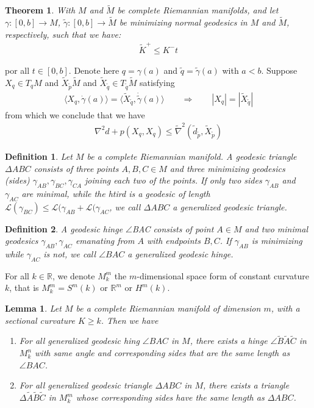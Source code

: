 \documentclass[11pt]{book}
\theoremstyle{break}
\theoremstyle{break}
\newtheorem{thm}{Theorem}[section]
\newtheorem{lem}{Lemma}[thm]
\newtheorem{defn}{Definition}[corL]
\newcommand{\R}{\mathbb{R}}
\newcommand{\that}[1]{\widetilde{#1}}
\begin{document}
\begin{thm}
With $M$ and $\that{M}$ be complete Riemannian manifolds, and let $\gamma:[0,b] \to M$, $\that{\gamma}: [0,b] \to \that{M}$ be minimizing normal geodesics in $M$ and $\that{M}$, respectively, such that we have:
\begin{align*}
\that{K}^+ \leq K^{-}t 
\end{align*}
\end{thm}
por all $t \in [0,b]$. Denote here $q = \gamma(a)$ and $\that{q} = \that{\gamma}(a)$ with $a<b$. Suppose $X_q \in T_qM$ and $\that{X}_{\that{p}}\that{M}$ and $\that{X}_{\that{q}} \in T_{\that{q} }\that{M}$ satisfying
\begin{align*}
\langle X_q , \dot{\gamma}(a) \rangle = \langle \that{X}_{\that{q}} , \dot{\that{\gamma}} (a) \rangle \qquad \Rightarrow \qquad |X_q| = |\that{X}_{\that{q}}|
\end{align*}
from which we conclude that we have
\begin{align*}
\nabla^2 d+p(X_q,X_q) \leq \that{\nabla}^2 (\that{d}_{\that{p}}, \that{X}_{\that{p}})
\end{align*}


\begin{defn}
Let $M$ be a complete Riemannian manifold. A geodesic triangle $\Delta ABC$ consists of three points $A,B,C \in M$ and three minimizing geodesics (sides) $\gamma_{AB}, \gamma_{BC}, \gamma_{CA}$ joining each two of the points. If only two sides $\gamma_{AB}$ and $\gamma_{AC}$ are minimal, while the htird is a geodesic of length $\mathcal{L}(\gamma_{BC}) \leq \mathcal{L}(\gamma_{AB} + \mathcal{L}(\gamma_{AC} $, we call $\Delta ABC$ a generalized geodesic triangle. 
\end{defn}


\begin{defn}
A geodesic hinge $\angle$BAC consists of point $A \in M$ and two minimal geodesics $\gamma_{AB}, \gamma_{AC} $ emanating from $A$ with endpoints $B,C$. If $\gamma_{AB}$ is minimizing while $\gamma_{AC}$ is not, we call $\angle BAC$ a generalized geodesic hinge.
\end{defn}


For all $k \in \R$, we denote $M_k^m$ the $m$-dimensional space form of constant curvature $k$, that is $M_k^m = S^m(k)$ or $\R^m$ or $H^m(k)$. 
\begin{lem}
Let $M$ be a complete Riemannian manifold of dimension $m$, with a sectional curvature $K \geq k$. Then we have
\begin{enumerate}
\item For all generalized geodesic hing $\angle BAC$ in $M$, there exists a hinge $\angle \that{B}\that{A}\that{C}$ in $M_k^n$ with same angle and corresponding sides that are the same length as $\angle BAC$. 
\item For all generalized geodesic triangle $\Delta ABC$ in $M$, there exists a triangle $\Delta \that{A}\that{B}\that{C}$ in $M_k^m$ whose corresponding sides have the same length as $\Delta ABC$. 
\end{enumerate}
\end{lem}
\end{document}
